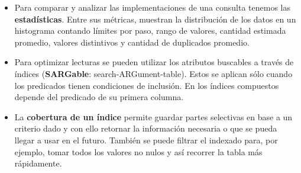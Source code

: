 \begin{itemize}
    \item Para comparar y analizar las implementaciones de una consulta tenemos las \textbf{estadísticas}. Entre sus métricas, muestran la distribución de los datos en un histograma contando límites por paso, rango de valores, cantidad estimada promedio, valores distintivos y cantidad de duplicados promedio.
    \item Para optimizar lecturas se pueden utilizar los atributos buscables a través de índices (\textbf{SARGable}: search-ARGument-table). Estos se aplican sólo cuando los predicados tienen condiciones de inclusión. En los índices compuestos depende del predicado de su primera columna.
    \item La \textbf{cobertura de un índice} permite guardar partes selectivas en base a un criterio dado y con ello retornar la información necesaria o que se pueda llegar a usar en el futuro. También se puede filtrar el indexado para, por ejemplo, tomar todos los valores no nulos y así recorrer la tabla más rápidamente.
\end{itemize}
